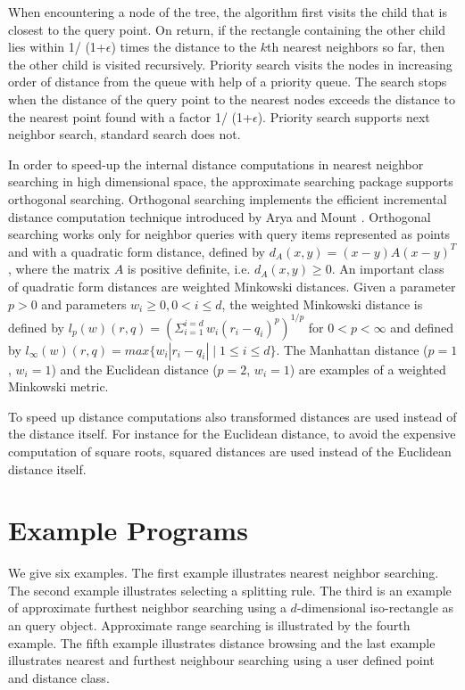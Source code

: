 When encountering a node of the tree, the algorithm first visits the child that is closest
to the query point. On return, if the rectangle containing  the other child lies within
1/ (1+$\epsilon$) times the distance to the $k$th nearest neighbors so far, then
the other child is visited recursively.
Priority search \cite{am-annqf-93} visits the nodes in increasing order of distance from
the queue with help of a priority queue.
The search stops when the distance of the query point to the nearest nodes
exceeds the distance to the nearest point found with a factor 1/ (1+$\epsilon$).
Priority search supports next neighbor search, standard search does not.

In order to speed-up the internal distance computations in nearest neighbor searching
in high dimensional space, the approximate searching package supports orthogonal searching. Orthogonal
searching implements the efficient incremental distance computation
technique introduced by Arya and Mount \cite{am-afvq-93}.
Orthogonal searching works only for neighbor queries with query items represented as
points and with a quadratic form distance, defined by $d_A(x,y)= (x-y)A(x-y)^T$, where the matrix
$A$ is positive definite, i.e. $d_A(x,y) \geq 0$. 
An important class of quadratic form distances are weighted Minkowski distances.
Given a parameter $p>0$ and parameters $w_i \geq 0, 0 < i \leq d$, the weighted 
Minkowski distance is defined by  $l_p(w)(r,q)= ({\Sigma_{i=1}^{i=d} \, w_i(r_i-q_i)^p})^{1/p}$ for $0 < p <\infty$ and
defined by $l_{\infty}(w)(r,q)=max \{w_i |r_i-q_i| \mid 1 \leq i \leq d\}$.
The Manhattan distance ($p=1$, $w_i=1$) and the
Euclidean distance ($p=2$, $w_i=1$) are examples of a weighted Minkowski metric.

To speed up distance computations also transformed
distances are used instead of the distance itself. 
For instance for the Euclidean distance, to avoid the expensive computation
of square roots, squared distances are used instead of the Euclidean distance itself. 


\section{Example Programs}

We give six examples. 
The first example illustrates nearest neighbor searching.
The second example illustrates selecting a splitting rule.
The third is an example of approximate furthest neighbor searching using a $d$-dimensional
iso-rectangle as an query object.
Approximate range
searching is illustrated by the fourth example.
The fifth example illustrates distance browsing and the last example illustrates 
nearest and furthest neighbour searching using
a user defined point and distance class.

